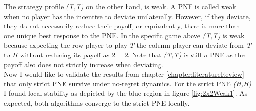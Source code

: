 The strategy profile \textit{(T,T)} on the other hand, is weak. A PNE is called weak when no player has the incentive to deviate unilaterally. However, if they deviate, they do not necessarily reduce their payoff, or equivalently, there is more than one unique best response to the PNE. In the specific game above \textit{(T,T)} is weak because expecting the row player to play \textit{T} the column player can deviate from \textit{T} to \textit{H} without reducing its payoff as $2 = 2$. Note that \textit{(T,T)} is still a PNE as the payoff also does not strictly increase when deviating. \\

Now I would like to validate the results from chapter \ref{chapter:literatureReview} that only strict PNE survive under no-regret dynamics. For the strict PNE \textit{(H,H)} I found local stability as depicted by the blue region in figure \ref{fig:2x2Weak1}. As expected, both algorithms converge to the strict PNE locally.

